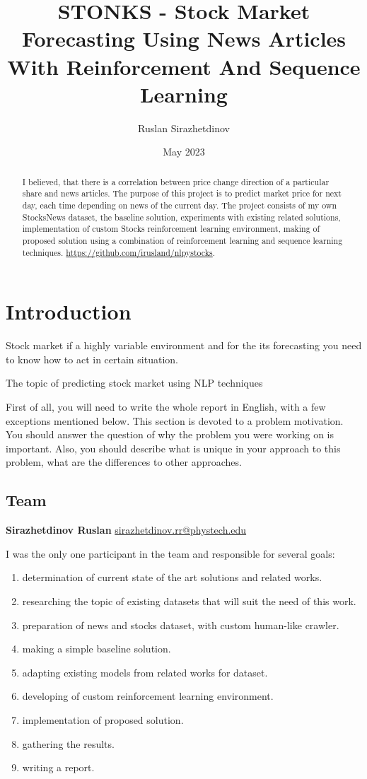 \documentclass{article}
\title{STONKS - Stock Market Forecasting Using News Articles With Reinforcement And Sequence Learning}
\author{Ruslan Sirazhetdinov}
\date{May 2023}
\begin{document}
\maketitle
\begin{abstract}
    I believed, that there is a correlation between price change direction of a particular share and news articles. The purpose of this project is to predict market price for next day, each time depending on news of the current day. The project consists of my own StocksNews dataset, the baseline solution, experiments with existing related solutions, implementation of custom Stocks reinforcement learning environment, making of proposed solution using a combination of reinforcement learning and sequence learning techniques.
    \url{https://github.com/irusland/nlpystocks}.
\end{abstract}



\section{Introduction}
Stock market if a highly variable environment and for the its forecasting you need to know how to act in certain situation. 

The topic of predicting stock market using NLP techniques 


First of all, you will need to write the whole report in English, with a few exceptions mentioned below.
This section is devoted to a problem motivation. You should answer the question of why the problem you were working on is important. Also, you should describe what is unique in your approach to this problem, what are the differences to other approaches.
\subsection{Team}
\textbf{Sirazhetdinov Ruslan} \href{mailto:sirazhetdinov.rr@phystech.edu}{sirazhetdinov.rr@phystech.edu}

I was the only one participant in the team and responsible for several goals:

\begin{enumerate}
  \item  determination of current state of the art solutions and related works.
  \item  researching the topic of existing datasets that will suit the need of this work.
  \item  preparation of news and stocks dataset, with custom human-like crawler.
  \item  making a simple baseline solution.
  \item  adapting existing models from related works for dataset.
  \item  developing of custom reinforcement learning environment.
  \item  implementation of proposed solution.
  \item  gathering the results.
  \item  writing a report.
  
\end{enumerate}
\end{document}
